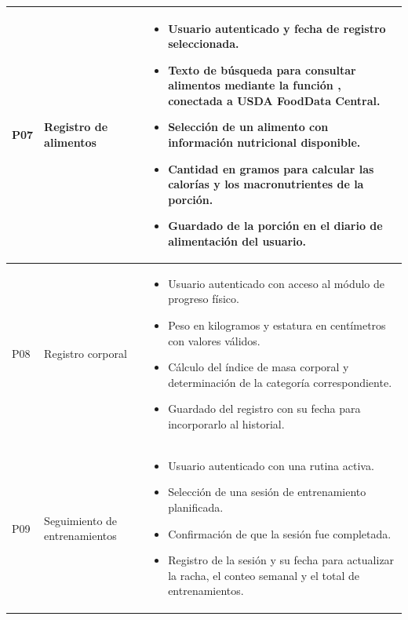 {\begin{longtable}{|L{1.3cm}|L{3.3cm}|L{9cm}|}
P07 & Registro de alimentos &
\begin{itemize}
    \item Usuario autenticado y fecha de registro seleccionada.
    \item Texto de búsqueda para consultar alimentos mediante la función
    , conectada a USDA FoodData Central.
    \item Selección de un alimento con información nutricional disponible.
    \item Cantidad en gramos para calcular las calorías y los macronutrientes
    de la porción.
    \item Guardado de la porción en el diario de alimentación del usuario.
\end{itemize}
\\ \hline

P08 & Registro corporal &
\begin{itemize}
    \item Usuario autenticado con acceso al módulo de progreso físico.
    \item Peso en kilogramos y estatura en centímetros con valores válidos.
    \item Cálculo del índice de masa corporal y determinación de la categoría
    correspondiente.
    \item Guardado del registro con su fecha para incorporarlo al historial.
\end{itemize}
\\ \hline

P09 & Seguimiento de entrenamientos &
\begin{itemize}
    \item Usuario autenticado con una rutina activa.
    \item Selección de una sesión de entrenamiento planificada.
    \item Confirmación de que la sesión fue completada.
    \item Registro de la sesión y su fecha para actualizar la racha,
    el conteo semanal y el total de entrenamientos.
\end{itemize}
\\ \hline


\end{longtable}}
